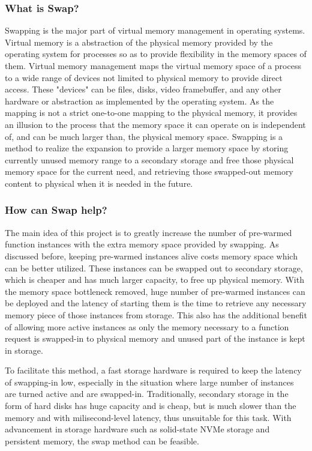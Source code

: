 \documentclass[conference]{IEEEtran}
\begin{document}
\subsubsection{What is Swap?}
Swapping is the major part of virtual memory management in operating systems. Virtual memory is a abstraction of the physical memory provided by the operating system for processes so as to provide flexibility in the memory spaces of them. Virtual memory management maps the virtual memory space of a process to a wide range of devices not limited to physical memory to provide direct access. These "devices" can be files, disks, video framebuffer, and any other hardware or abstraction as implemented by the operating system. As the mapping is not a strict one-to-one mapping to the physical memory, it provides an illusion to the process that the memory space it can operate on is independent of, and can be much larger than, the physical memory space. Swapping is a method to realize the expansion to provide a larger memory space by storing currently unused memory range to a secondary storage and free those physical memory space for the current need, and retrieving those swapped-out memory content to physical when it is needed in the future.

\subsubsection{How can Swap help?}
The main idea of this project is to greatly increase the number of pre-warmed function instances with the extra memory space provided by swapping. As discussed before, keeping pre-warmed instances alive costs memory space which can be better utilized. These instances can be swapped out to secondary storage, which is cheaper and has much larger capacity, to free up physical memory. With the memory space bottleneck removed, huge number of pre-warmed instances can be deployed and the latency of starting them is the time to retrieve any necessary memory piece of those instances from storage. This also has the additional benefit of allowing more active instances as only the memory necessary to a function request is swapped-in to physical memory and unused part of the instance is kept in storage.

To facilitate this method, a fast storage hardware is required to keep the latency of swapping-in low, especially in the situation where large number of instances are turned active and are swapped-in. Traditionally, secondary storage in the form of hard disks has huge capacity and is cheap, but is much slower than the memory and with milisecond-level latency, thus unsuitable for this task. With advancement in storage hardware such as solid-state NVMe storage and persistent memory\cite{foongStorageFastRest2016}, the swap method can be feasible.
\end{document}
